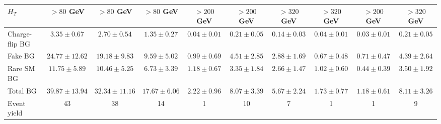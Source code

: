\begin{table}
\begin{scriptsize}
\begin{tabular}{l|c|c|c|c|c|c|c|c|c}
      $H_T$                  & $> 80$ GeV            & $> 80$ GeV            & $> 80$ GeV            & $> 200$ GeV           & $> 200$ GeV           & $> 320$ GeV           & $> 320$ GeV           & $> 200$ GeV           & $> 320$ GeV   \\
      \hline
      Charge-flip BG         & $3.35 \pm 0.67$ & $2.70 \pm 0.54$ & $1.35 \pm 0.27$ & $0.04 \pm 0.01$ & $0.21 \pm 0.05$ & $0.14 \pm 0.03$ & $0.04 \pm 0.01$ & $0.03 \pm 0.01$ & $0.21 \pm 0.05$\\
      Fake BG                & $24.77 \pm 12.62$ & $19.18 \pm 9.83$ & $9.59 \pm 5.02$ & $0.99 \pm 0.69$ & $4.51 \pm 2.85$ & $2.88 \pm 1.69$ & $0.67 \pm 0.48$ & $0.71 \pm 0.47$ & $4.39 \pm 2.64$  \\
      Rare SM BG             & $11.75 \pm 5.89$ & $10.46 \pm 5.25$ & $6.73 \pm 3.39$ & $1.18 \pm 0.67$ & $3.35 \pm 1.84$ & $2.66 \pm 1.47$ & $1.02 \pm 0.60$ & $0.44 \pm 0.39$ & $3.50 \pm 1.92$  \\
      \hline
      Total BG               & $39.87 \pm 13.94$ & $32.34 \pm 11.16$ & $17.67 \pm 6.06$ & $2.22 \pm 0.96$ & $8.07 \pm 3.39$ & $5.67 \pm 2.24$ & $1.73 \pm 0.77$ & $1.18 \pm 0.61$ & $8.11 \pm 3.26$  \\
      Event yield            & 43                & 38                & 14                & 1                & 10                & 7                & 1                & 1                & 9              \\
      \hline
      \hline
    \end{tabular}
  \end{scriptsize}
\end{table}
